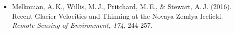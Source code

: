 
\begin{itemize}
    \item Melkonian, A.\,K., Willis, M.\,J., Pritchard, M.\,E., \& Stewart, A.\,J. (2016). Recent Glacier Velocities and Thinning at the Novaya Zemlya Icefield. \textit{Remote Sensing of Environment, 174}, 244-257.
\end{itemize}
